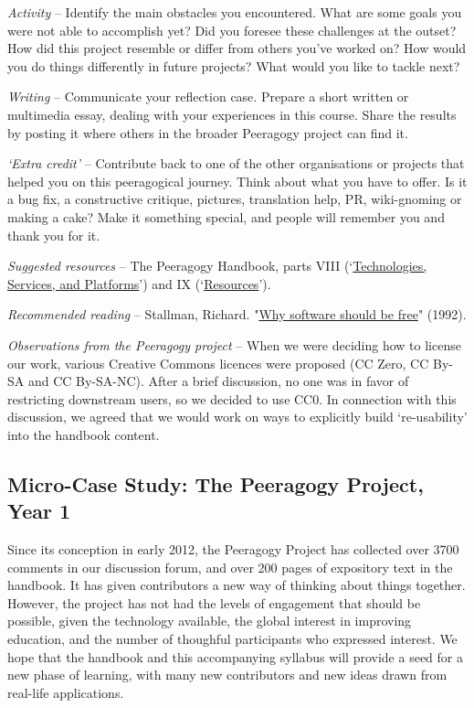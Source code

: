 \emph{Activity} -- Identify the main obstacles you encountered. What are
some goals you were not able to accomplish yet? Did you foresee these
challenges at the outset? How did this project resemble or differ from
others you've worked on? How would you do things differently in future
projects? What would you like to tackle next?

\emph{Writing} -- Communicate your reflection case. Prepare a short
written or multimedia essay, dealing with your experiences in this
course. Share the results by posting it where others in the broader
Peeragogy project can find it.

\emph{`Extra credit'} -- Contribute back to one of the other
organisations or projects that helped you on this peeragogical journey.
Think about what you have to offer. Is it a bug fix, a constructive
critique, pictures, translation help, PR, wiki-gnoming or making a cake?
Make it something special, and people will remember you and thank you
for it.

\emph{Suggested resources} -- The Peeragogy Handbook, parts VIII
(`\href{http://peeragogy.org/resources/technologies/}{Technologies,
Services, and Platforms}') and IX
(`\href{http://peeragogy.org/resources/}{Resources}').

\emph{Recommended reading} -- Stallman, Richard.
"\href{http://www.gnu.org/philosophy/shouldbefree.html}{Why software
should be free}" (1992).

\emph{Observations from the Peeragogy project} -- When we were deciding
how to license our work, various Creative Commons licences were proposed
(CC Zero, CC By-SA and CC By-SA-NC). After a brief discussion, no one
was in favor of restricting downstream users, so we decided to use CC0.
In connection with this discussion, we agreed that we would work on ways
to explicitly build `re-usability' into the handbook content.

\subsection{Micro-Case Study: The Peeragogy Project, Year 1}

Since its conception in early 2012, the Peeragogy Project has collected
over 3700 comments in our discussion forum, and over 200 pages of
expository text in the handbook. It has given contributors a new way of
thinking about things together. However, the project has not had the
levels of engagement that should be possible, given the technology
available, the global interest in improving education, and the number of
thoughful participants who expressed interest. We hope that the handbook
and this accompanying syllabus will provide a seed for a new phase of
learning, with many new contributors and new ideas drawn from real-life
applications.

